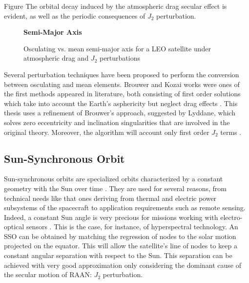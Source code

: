 Figure %
The orbital decay induced by the atmospheric drag secular effect is evident, as well as the periodic consequences of $J_2$ perturbation.
\begin{figure}[h] \label{fig:osc_vs_mean_sma}
    \begin{center}
        \textbf{Semi-Major Axis}\par\medskip
    \end{center}
    \caption{Osculating vs. mean semi-major axis for a LEO satellite under atmospheric drag and $J_2$ perturbations}
\end{figure}

Several perturbation techniques have been proposed to perform the conversion between osculating and mean elements. 
Brouwer and Kozai works were ones of the first methods appeared in literature, both consisting of first order solutions which take into account the Earth's asphericity but neglect drag effects \cite{arnas2022analytic}.
This thesis uses a refinement of Brouwer's approach, suggested by Lyddane, which solves zero eccentricity and inclination singularities that are involved in the original theory.
Moreover, the algorithm will account only first order $J_2$ terms \cite{schaub2002analytical}.

\subsection{Sun-Synchronous Orbit} \label{sso_paragraph}
Sun-synchronous orbits are specialized orbits characterized by a constant geometry with the Sun over time \cite{vallado2013fundamentals}. 
They are used for several reasons, from technical needs like that ones deriving from thermal and electric power subsystems of the spacecraft to application requirements such as remote sensing.
Indeed, a constant Sun angle is very precious for missions working with electro-optical sensors \cite{brown1998spacecraft}.
This is the case, for instance, of hyperspectral technology. 
An SSO can be obtained by matching the regression of nodes to the solar motion projected on the equator.
This will allow the satellite's line of nodes to keep a constant angular separation with respect to the Sun.
This separation can be achieved with very good approximation only considering the dominant cause of the secular motion of RAAN: $J_2$ perturbation.  

